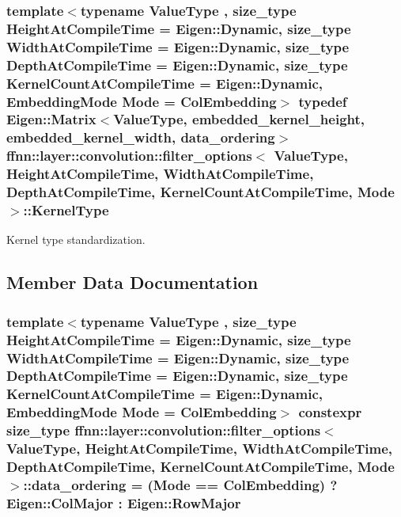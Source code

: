 \hypertarget{structffnn_1_1layer_1_1convolution_1_1filter__options_a4a15f803755f1947f64292cc4fd8553d}{
\subsubsection[{Kernel\-Type}]{\setlength{\rightskip}{0pt plus 5cm}template$<$typename Value\-Type , size\-\_\-type Height\-At\-Compile\-Time = Eigen\-::\-Dynamic, size\-\_\-type Width\-At\-Compile\-Time = Eigen\-::\-Dynamic, size\-\_\-type Depth\-At\-Compile\-Time = Eigen\-::\-Dynamic, size\-\_\-type Kernel\-Count\-At\-Compile\-Time = Eigen\-::\-Dynamic, Embedding\-Mode Mode = Col\-Embedding$>$ typedef Eigen\-::\-Matrix$<$Value\-Type, {\bf embedded\-\_\-kernel\-\_\-height}, {\bf embedded\-\_\-kernel\-\_\-width}, {\bf data\-\_\-ordering}$>$ {\bf ffnn\-::layer\-::convolution\-::filter\-\_\-options}$<$ Value\-Type, Height\-At\-Compile\-Time, Width\-At\-Compile\-Time, Depth\-At\-Compile\-Time, Kernel\-Count\-At\-Compile\-Time, Mode $>$\-::{\bf Kernel\-Type}}}\label{structffnn_1_1layer_1_1convolution_1_1filter__options_a4a15f803755f1947f64292cc4fd8553d}


Kernel type standardization. 



\subsection{Member Data Documentation}
\hypertarget{structffnn_1_1layer_1_1convolution_1_1filter__options_acc94f67d99e44b20f0ef04947eea68c2}{
\subsubsection[{data\-\_\-ordering}]{\setlength{\rightskip}{0pt plus 5cm}template$<$typename Value\-Type , size\-\_\-type Height\-At\-Compile\-Time = Eigen\-::\-Dynamic, size\-\_\-type Width\-At\-Compile\-Time = Eigen\-::\-Dynamic, size\-\_\-type Depth\-At\-Compile\-Time = Eigen\-::\-Dynamic, size\-\_\-type Kernel\-Count\-At\-Compile\-Time = Eigen\-::\-Dynamic, Embedding\-Mode Mode = Col\-Embedding$>$ constexpr {\bf size\-\_\-type} {\bf ffnn\-::layer\-::convolution\-::filter\-\_\-options}$<$ Value\-Type, Height\-At\-Compile\-Time, Width\-At\-Compile\-Time, Depth\-At\-Compile\-Time, Kernel\-Count\-At\-Compile\-Time, Mode $>$\-::data\-\_\-ordering = (Mode == {\bf Col\-Embedding}) ? Eigen\-::\-Col\-Major \-: Eigen\-::\-Row\-Major\hspace{0.3cm}{\ttfamily [static]}}}\label{structffnn_1_1layer_1_1convolution_1_1filter__options_acc94f67d99e44b20f0ef04947eea68c2}


